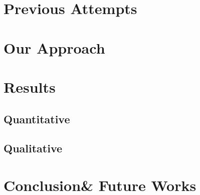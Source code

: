 \documentclass{beamer}
\begin{document}
\section{Previous Attempts}
\section{Our Approach}
\section{Results}
\subsection{Quantitative}
\subsection{Qualitative}
\section{Conclusion\& Future Works}
\end{document}
